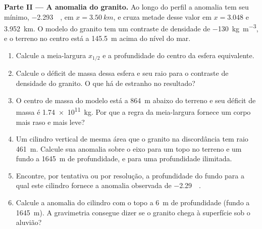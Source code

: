 \begin{problem}
\medskip\noindent\textbf{Parte II --- A anomalia do granito.} Ao longo
do perfil a anomalia tem seu mínimo, \qty{-2.293}{\milli\gal}, em
$x = \qty{3.50}{km}$, e cruza metade desse valor em $x = 3.048$ e
\qty{3.952}{km}. O modelo do granito tem um contraste de densidade de
\qty{-130}{kg.m^{-3}}, e o terreno no centro está a \qty{145.5}{m}
acima do nível do mar.
\begin{enumerate}[resume]
\item Calcule a meia-largura $x_{1/2}$ e a profundidade do centro da
  esfera equivalente.
\item Calcule o déficit de massa dessa esfera e seu raio para o
  contraste de densidade do granito. O que há de estranho no resultado?
\item O centro de massa do modelo está a \qty{864}{m} abaixo do terreno e seu
  déficit de massa é \qty{1.74e11}{kg}. Por que a regra da meia-largura fornece um
  corpo mais raso e mais leve?
\item Um cilindro vertical de mesma área que o granito na
  discordância tem raio \qty{461}{m}. Calcule sua anomalia sobre o eixo
  para um topo no terreno e um fundo a \qty{1645}{m} de profundidade, e para uma
  profundidade ilimitada.
\item Encontre, por tentativa ou por resolução, a profundidade do fundo para a qual este
  cilindro fornece a anomalia observada de \qty{-2.29}{\milli\gal}.
\item Calcule a anomalia do cilindro com o topo a \qty{6}{m} de
  profundidade (fundo a \qty{1645}{m}). A gravimetria consegue dizer se o granito chega
  à superfície sob o aluvião?
\end{enumerate}


\end{problem}
